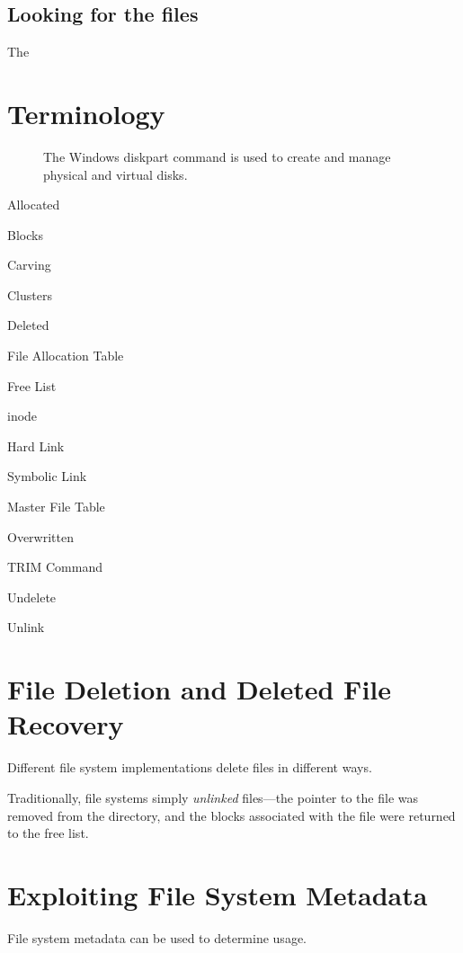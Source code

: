 \documentclass[11pt,letter]{book}
\newcommand{\sgraphic}[3][width=\linewidth]{
  \begin{figure}
  \begin{center}
  \fbox{\texttt{[image: \#2]}}
  \end{center}
  \caption{#3\label{#2}}
  \end{figure}
}
\begin{document}
\subsection{Looking for the files}
The 

\section{Terminology}
\sgraphic{art/diskpart-1}{The Windows diskpart command is used to create and
  manage physical and virtual disks.}


Allocated

Blocks

Carving

Clusters

Deleted

File Allocation Table

Free List

inode

Hard Link

Symbolic Link

Master File Table

Overwritten

TRIM Command

Undelete

Unlink



\section{File Deletion and Deleted File Recovery}\label{deleted_file_recovery}
Different file system implementations delete files in different ways.

Traditionally, file systems simply \emph{unlinked} files---the pointer
to the file was removed from the directory, and the blocks associated
with the file were returned to the free list.


\section{Exploiting File System Metadata}
File system metadata can be used to determine usage. 
\cite{dfrws2011:JonathanGrier}


\end{document}
